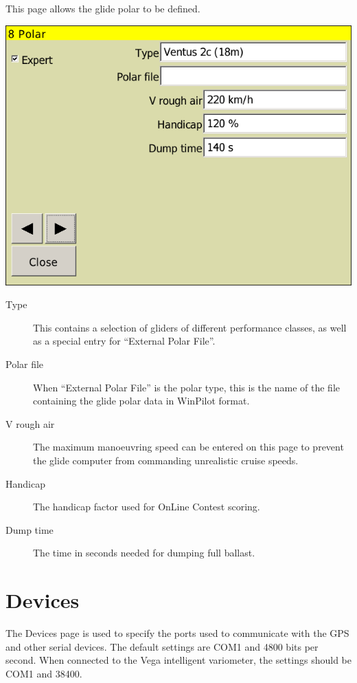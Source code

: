 \documentclass[a4paper,12pt]{refrep}
\begin{document}
This page allows the glide polar to be defined.

\begin{center}
\includegraphics[angle=0,width=0.8\linewidth,keepaspectratio='true']{figures/config-polar.png}
\end{center}

\begin{description}
\item[Type]  \label{conf:polar} This contains a selection of gliders of
different performance classes, as well as a special entry for ``External Polar File''.  
\item[Polar file]  When ``External Polar File'' is the polar type, 
 this is the name of the file containing the glide polar data in WinPilot
 format.
\item[V rough air] The maximum manoeuvring speed can be entered on this page to prevent the glide computer from commanding unrealistic cruise speeds.
\item[Handicap] The handicap factor used for OnLine Contest scoring.
\item[Dump time] The time in seconds needed for dumping full ballast.
\end{description}

\clearpage
\section{Devices} \label{conf:comdevices}

The Devices page is used to specify the ports used to communicate with
the GPS and other serial devices. The default settings are COM1 and
4800 bits per second.  When connected to the Vega intelligent
variometer, the settings should be COM1 and 38400.
\end{document}
